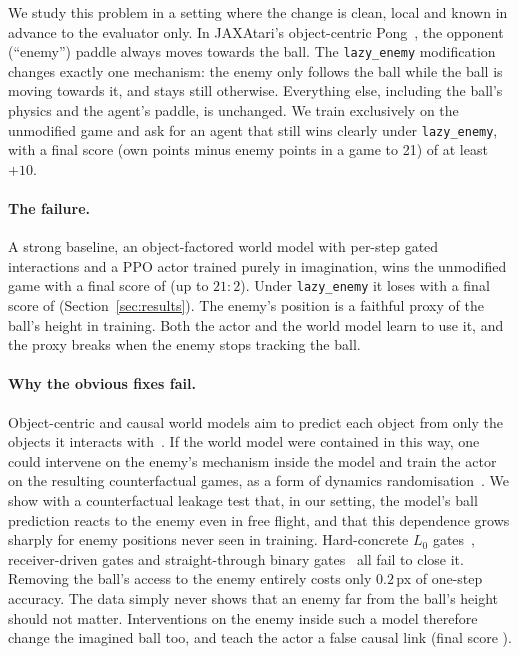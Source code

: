 \documentclass{article}
\newcommand{\lazy}{\texttt{lazy\_enemy}}
\begin{document}
We study this problem in a setting where the change is clean, local and known in advance to the
evaluator only. In JAXAtari's object-centric Pong~\cite{jaxatari,delfosse2023ocatari}, the opponent
(``enemy'') paddle always moves towards the ball. The \lazy{} modification~\cite{delfosse2024hackatari}
changes exactly one mechanism: the enemy only follows the ball while the ball is moving towards it,
and stays still otherwise. Everything else, including the ball's physics and the agent's paddle, is
unchanged. We train exclusively on the unmodified game and ask for an agent that still wins clearly
under \lazy{}, with a final score (own points minus enemy points in a game to 21) of at least $+10$.

\paragraph{The failure.} A strong baseline, an object-factored world model with per-step gated
interactions and a PPO actor trained purely in imagination, wins the unmodified game with a final
score of \BasePong{} (up to $21{:}2$).
Under \lazy{} it loses with a final score of \BaseLazy{} (Section~\ref{sec:results}). The enemy's
position is a faithful proxy of the ball's height in training. Both the actor and the world model
learn to use it, and the proxy breaks when the enemy stops tracking the ball.

\paragraph{Why the obvious fixes fail.} Object-centric and causal world models aim to predict each
object from only the objects it interacts with~\cite{battaglia2016interaction,kipf2018nri,kipf2020cswm,goyal2021rims,scholkopf2021causal,pitis2020coda,wang2022cdl}.
If the world model were contained in this way, one could intervene on the enemy's mechanism
inside the model and train the actor on the resulting counterfactual games, as a form of dynamics
randomisation~\cite{peng2018sim2real,tobin2017domain}. We show with a counterfactual leakage test
that, in our setting, the model's ball prediction reacts to the enemy even in free flight, and that
this dependence grows sharply for enemy positions never seen in training. Hard-concrete
$L_0$ gates~\cite{louizos2018l0}, receiver-driven gates and straight-through binary
gates~\cite{bengio2013estimating} all fail to close it. Removing the ball's access to the enemy
entirely costs only $0.2$\,px of one-step accuracy. The data simply never shows that an enemy far from the
ball's height should not matter. Interventions on the enemy inside such a model therefore change the
imagined ball too, and teach the actor a false causal link (final score \DynLazy{}).
\end{document}
